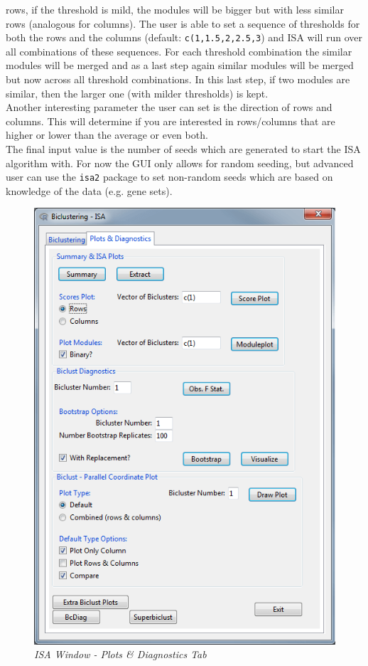 \documentclass[a4paper]{article}\usepackage[]{graphicx}\usepackage[]{color}
\begin{document}
rows, if the threshold is mild, the modules will be
bigger but with less similar rows (analogous for columns). The user is able to
set a sequence of thresholds for both the rows and the columns (default:
\verb|c(1,1.5,2,2.5,3|) and ISA will run over all combinations of these
sequences. For each threshold combination the similar modules will be merged and
as a last step again similar modules will be merged but now across all threshold
combinations. In this last step, if two modules are similar, then the larger one
(with milder thresholds) is kept.\\
Another interesting parameter the user can set is the direction of rows and
columns. This will determine if you are interested in rows/columns that are
higher or lower than the average or even both.\\
The final input value is the number of seeds which are generated to start the
ISA algorithm with. For now the GUI only allows for random seeding, but advanced
user can use the \verb|isa2| package to set non-random seeds which are based on
knowledge of the data (e.g. gene sets).
\begin{figure}[H]
\centering
\includegraphics[scale=0.5]{figures/isa_plotdiagtab.png}
\caption{{\it ISA Window - Plots \& Diagnostics Tab}\label{isa_plotdiagtab}}
\end{figure}
\end{document}
